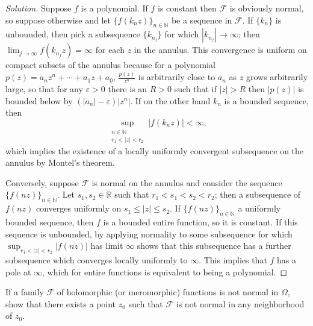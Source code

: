 \documentclass[10pt]{article}
\providecommand{\eps}{\varepsilon}
\providecommand{\NN}{\mathbb N}
\providecommand{\RR}{\mathbb R}
\newenvironment{soln}{\begin{proof}[Solution]}{\end{proof}}
\providecommand{\abs}[1]{\left\lvert #1\right\rvert}
\begin{document}
\begin{soln}
    Suppose $f$ is a polynomial.
    If $f$ is constant then $\mathcal F$ is obviously normal, so suppose
    otherwise and let $\{f(k_nz)\}_{n\in\NN}$ be a sequence in $\mathcal F$.
    If $\{k_n\}$ is unbounded, then pick a subsequence $\{k_{n_j}\}$
    for which $\abs{k_{n_j}}\to\infty$;
    then $\lim_{j\to\infty} f(k_{n_j}z) = \infty$
    for each $z$ in the annulus. This convergence is
    uniform on compact subsets of the annulus because
    for a polynomial $p(z) = a_nz^n + \cdots + a_1z + a_0$,
    $\frac{p(z)}{z^n}$ is arbitrarily close to $a_n$
    as $z$ grows arbitrarily large, so that
    for any $\eps > 0$ there is an $R > 0$ such that if $\abs z > R$ then
    $\abs{p(z)}$ is bounded below by $(\abs{a_n} - \eps)\abs{z^n}$.
    If on the other hand $k_n$ is a bounded sequence, then
    \begin{equation*}
	\sup_{\substack{n\in\NN \\ r_1 < \abs z < r_2}} \abs{f(k_nz)} < \infty,
    \end{equation*}
    which implies the existence of a locally uniformly convergent
    subsequence on the annulus by Montel's theorem.

    Conversely, suppose $\mathcal F$ is normal on the annulus and
    consider the sequence $\{f(nz)\}_{n\in\NN}$.
    Let $s_1,s_2\in\RR$ such that $r_1 < s_1 < s_2 < r_2$;
    then a subsequence of $f(nz)$ converges uniformly on
    $s_1\le\abs z\le s_2$. If $\{f(nz)\}_{n\in\NN}$
    a uniformly bounded sequence, then $f$ is a bounded entire function,
    so it is constant. If this sequence is unbounded,
    by applying normality to some subsequence for which
    $\sup_{r_1 < \abs z < r_2} \abs{f(nz)}$ has limit $\infty$
    shows that this subsequence has a further subsequence
    which converges locally uniformly to $\infty$.
    This implies that $f$ has a pole at $\infty$,
    which for entire functions is equivalent to being a polynomial.
\end{soln}

\pagebreak

\begin{problem}
    [p.227\#4]
    If a family $\mathcal F$ of holomorphic (or meromorphic)
    functions is not normal in $\Omega$,
    show that there exists a point $z_0$ such that
    $\mathcal F$ is not normal in any neighborhood of $z_0$.
\end{problem}
\end{document}
